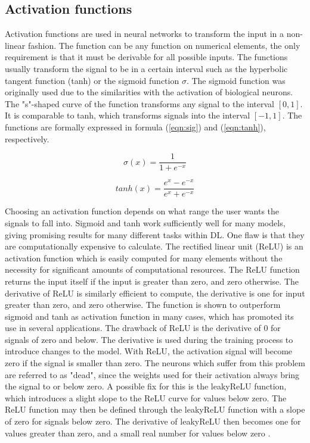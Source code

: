\subsection{Activation functions}

Activation functions are used in neural networks to transform the input in a non-linear fashion. The function can be any function on numerical elements, the only requirement is that it must be derivable for all possible inputs. The functions usually transform the signal to be in a certain interval such as the hyperbolic tangent function (tanh) or the sigmoid function $\sigma$. The sigmoid function was originally used due to the similarities with the activation of biological neurons. The "s"-shaped curve of the function transforms any signal to the interval $[0, 1]$. It is comparable to tanh, which transforms signals into the interval $[-1, 1]$. The functions are formally expressed in formula (\ref{eqn:sig}) and (\ref{eqn:tanh}), respectively.

\begin{equation}
\label{eqn:sig}
\sigma(x) = \frac{1}{1+e^{-x}}
\end{equation}

\begin{equation}
\label{eqn:tanh}
tanh(x) = \frac{e^x - e^{-x}}{e^x + e^{-x}}
\end{equation}

Choosing an activation function depends on what range the user wants the signals to fall into. Sigmoid and tanh work sufficiently well for many models, giving promising results for many different tasks within DL. One flaw is that they are computationally expensive to calculate. The rectified linear unit (ReLU) is an activation function which is easily computed for many elements without the necessity for significant amounts of computational resources. The ReLU function returns the input itself if the input is greater than zero, and zero otherwise. The derivative of ReLU is similarly efficient to compute, the derivative is one for input greater than zero, and zero otherwise. The function is shown to outperform sigmoid and tanh as activation function in many cases, which has promoted its use in several applications. The drawback of ReLU is the derivative of 0 for signals of zero and below. The derivative is used during the training process to introduce changes to the model. With ReLU, the activation signal will become zero if the signal is smaller than zero. The neurons which suffer from this problem are referred to as "dead", since the weights used for their activation always bring the signal to or below zero. A possible fix for this is the leakyReLU function, which introduces a slight slope to the ReLU curve for values below zero. The ReLU function may then be defined through the leakyReLU function with a slope of zero for signals below zero. The derivative of leakyReLU then becomes one for values greater than zero, and a small real number for values below zero \cite{agarap2018deep, lu2019dying}.

